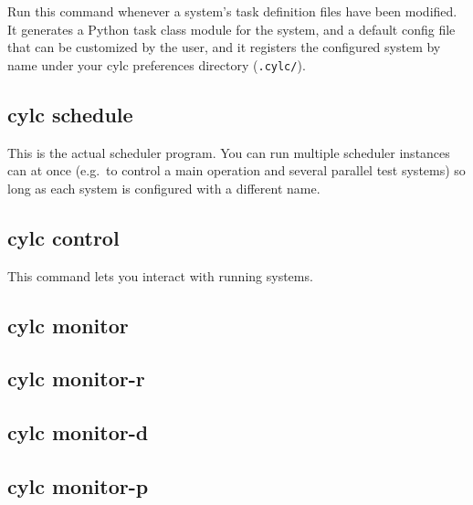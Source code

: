 \documentclass[11pt,a4paper]{article}
\begin{document}
Run this command whenever a system's task definition files have been
modified. It generates a Python task class module for the system, and a
default config file that can be customized by the user, and it registers
the configured system by name under your cylc preferences directory
(\verb=.cylc/=).

{ \color{Brown}
 
}

\pagebreak
\subsection{cylc schedule}

This is the actual scheduler program. You can run multiple scheduler
instances can at once (e.g.\ to control a main operation
and several parallel test systems) so long as each system is configured
with a different name. 
{
\color{Brown}

}

\pagebreak
\subsection{cylc control}

This command lets you interact with running systems.

{
\color{Brown}

}

\pagebreak
\subsection{cylc monitor}
{
\color{Brown}

}

\subsection{cylc monitor-r}
{
\color{Brown}

}

\subsection{cylc monitor-d}
{
\color{Brown}

}

\subsection{cylc monitor-p}
{
\color{Brown}

}
\end{document}
